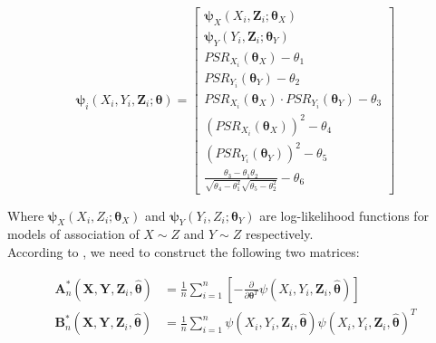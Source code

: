\documentclass[]{article}
\begin{document}
\[
\pmb{\psi}_i(X_i, Y_i, \pmb{Z}_i; \pmb{\theta}) = \begin{bmatrix}
    \pmb{\psi}_X(X_i,\pmb{Z}_i; \pmb{\theta}_X) \\
    \pmb{\psi}_Y(Y_i,\pmb{Z}_i; \pmb{\theta}_Y) \\
    PSR_{X_{i}}(\pmb{\theta}_X) -\theta_1 \\
    PSR_{Y_{i}}(\pmb{\theta}_Y) -\theta_2 \\
    PSR_{X_{i}}(\pmb{\theta}_X) \cdot PSR_{Y_i}(\pmb{\theta}_Y) -\theta_3 \\
    (PSR_{X_{i}}(\pmb{\theta}_X))^2 -\theta_4 \\
    (PSR_{Y_{i}}(\pmb{\theta}_Y))^2 -\theta_5 \\
    \frac{\theta_3 - \theta_1\theta_2}{\sqrt{\theta_4 - \theta_1^2}\sqrt{\theta_5 - \theta_2^2}} - \theta_6
\end{bmatrix}
\]

Where $\pmb{\psi}_X(X_i,Z_i; \pmb{\theta}_X)$ and $\pmb{\psi}_Y(Y_i,Z_i; \pmb{\theta}_Y)$ are log-likelihood functions for models of association of $X\sim Z $ and $Y \sim Z$ respectively.\\
According to \cite{stefanski2002calculus}, we need to construct the following two matrices:

	
	$$
	\begin{aligned}
		\pmb{A}^*_n(\pmb{X}, \pmb{Y}, \pmb{Z}_i, \hat{\pmb{\theta}}) &= \frac{1}{n} \sum_{i = 1}^{n}\left[ -\frac{\partial}{\partial \pmb{\theta}^T}\psi(X_i, Y_i, \pmb{Z}_i, \hat{\pmb{\theta}}) \right]\\
		\pmb{B}^*_n(\pmb{X}, \pmb{Y}, \pmb{Z}_i, \hat{\pmb{\theta}}) &= \frac{1}{n} \sum_{i = 1}^{n} \psi(X_i, Y_i, \pmb{Z}_i, \hat{\pmb{\theta}}) \psi(X_i, Y_i, \pmb{Z}_i, \hat{\pmb{\theta}})^T\\
 	\end{aligned}
	$$
\end{document}
